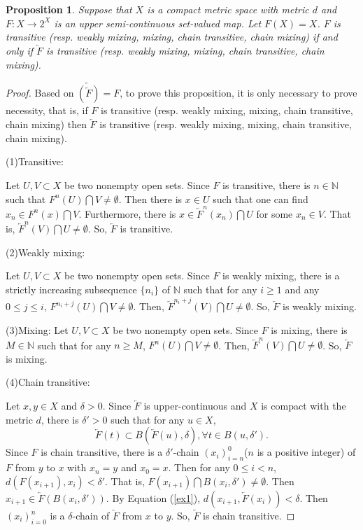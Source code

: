 \documentclass[12pt]{amsart}
\newtheorem{proposition}[theorem]{Proposition}
\theoremstyle{definition}
\begin{document}
\begin{proposition}\label{prop1}
	Suppose that $X$ is a compact metric space with metric $d$ and $F:X\rightarrow 2^X$ is an upper semi-continuous set-valued map. Let $F(X)=X$. $F$ is transitive (resp. {weakly mixing, mixing, chain transitive, chain mixing}) if and only if $\underleftarrow{F}$ is transitive (resp. {weakly mixing, mixing, chain transitive, chain mixing}).
\end{proposition}
\begin{proof}
	{Based on $\underleftarrow{(\underleftarrow{F})}=F$, to prove this proposition, it is only necessary to prove necessity, that is, if $F$ is transitive (resp. {weakly mixing, mixing, chain transitive, chain mixing}) then $\underleftarrow{F}$ is transitive (resp. {weakly mixing, mixing, chain transitive, chain mixing}).}
	
	(1)Transitive: 
	
	{Let $U,V\subset X$ be two nonempty open sets. Since $F$ is transitive, there is $n\in\mathbb{N}$ such that $F^n(U)\bigcap V\neq\emptyset$. Then there is $x\in U$ such that one can find  $x_n\in F^n(x)\bigcap V$. Furthermore, there is $x\in\underleftarrow{F}^n(x_n)\bigcap U$ for some $x_n\in V$. That is, $\underleftarrow{F}^n(V)\bigcap U\neq\emptyset$. So, $\underleftarrow{F}$ is transitive.}
	
	(2)Weakly mixing:
	
	{Let $U,V\subset X$ be two nonempty open sets. Since $F$ is weakly mixing,  there is a strictly increasing subsequence $\{n_i\}$ of $\mathbb{N}$ such that for any $i\geq 1$ and any $0\leq j\leq i$, $F^{n_i+j}(U)\bigcap V\neq\emptyset$.
		Then,  $\underleftarrow{F}^{n_i+j}(V)\bigcap U\neq\emptyset$. So, $\underleftarrow{F}$ is weakly mixing.}
	
	(3)Mixing:
	Let $U,V\subset X$ be two nonempty open sets. Since $F$ is mixing, there is $M\in\mathbb{N}$ such that for any $n\geq M$, $F^{n}(U)\bigcap V\neq\emptyset$. Then, $\underleftarrow{F}^{n}(V)\bigcap U\neq\emptyset$. So, $\underleftarrow{F}$ is mixing.
	
	(4)Chain transitive:
	
	Let $x,y\in X$ and $\delta>0$. Since $\underleftarrow{F}$ is upper-continuous and $X$ is compact with the metric $d$, there is $\delta'>0$ such that for any $u\in X$, 
	\begin{equation}\label{ex1}
		\underleftarrow{F}(t)\subset B(\underleftarrow{F}(u),\delta), \forall t\in B(u,\delta').
	\end{equation}
	Since $F$ is chain transitive, there is a $\delta'$-chain $(x_i)^0_{i=n}$($n$ is a positive integer) of $F$ from $y$ to $x$ with $x_n=y$ and $x_0=x$. Then for any $0\leq i<n$, $d(F(x_{i+1}),x_{i})<\delta'$. That is, $F(x_{i+1})\bigcap B(x_i,\delta')\neq\emptyset$. Then $x_{i+1}\in\underleftarrow{F}(B(x_i,\delta'))$. By {Equation (\ref{ex1})}, $d(x_{i+1},\underleftarrow{F}(x_i))<\delta$. Then $(x_i)^n_{i=0}$ is a $\delta$-chain of $\underleftarrow{F}$ from $x$ to $y$. So, $\underleftarrow{F}$ is chain transitive.
	

\end{proof}
\end{document}
